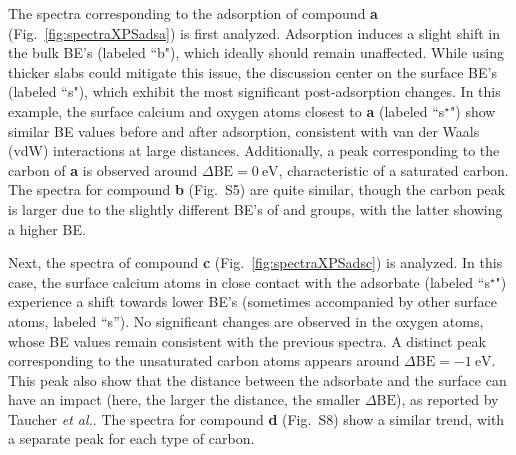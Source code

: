 \documentclass[%
aip,
amsmath,amssymb,
preprint,%
jcp,
showkeys,
]{revtex4-2}
\def\dbe{\ensuremath{\Delta\text{BE}}}
\begin{document}
The spectra corresponding to the adsorption of compound \textbf{a} (Fig.~\ref{fig:spectraXPSadsa}) is first analyzed. Adsorption induces a slight shift in the bulk BE's (labeled ``b"), which ideally should remain unaffected. While using thicker slabs could mitigate this issue, the discussion center on the surface BE's (labeled ``s"), which exhibit the most significant post-adsorption changes. In this example, the surface calcium and oxygen atoms closest to \textbf{a} (labeled ``s$^\star$") show similar BE values before and after adsorption, consistent with van der Waals (vdW) interactions at large distances. Additionally, a peak corresponding to the carbon of \textbf{a} is observed around $\dbe = \SI{0}{\electronvolt}$, characteristic of a saturated carbon. The spectra for compound \textbf{b} (Fig.~S5) are quite similar, though the carbon peak is larger due to the slightly different BE's of  and  groups, with the latter showing a higher BE.


\clearpage

Next, the spectra of compound \textbf{c} (Fig.~\ref{fig:spectraXPSadsc}) is analyzed. In this case, the surface calcium atoms in close contact with the adsorbate (labeled ``s$^\star$") experience a shift towards lower BE's (sometimes accompanied by other surface atoms,  labeled ``s''). No significant changes are observed in the oxygen atoms, whose BE values remain consistent with the previous spectra. A distinct peak corresponding to the unsaturated carbon atoms appears around $\dbe = \SI{-1}{\electronvolt}$. This peak also show that the distance between the adsorbate and the surface can have an impact (here, the larger the distance, the smaller \dbe{}), as reported by Taucher \emph{et al.}\cite{taucherFinalStateSimulationsCoreLevel2020}. The spectra for compound \textbf{d} (Fig.~S8) show a similar trend, with a separate peak for each type of carbon.


\clearpage
\end{document}
